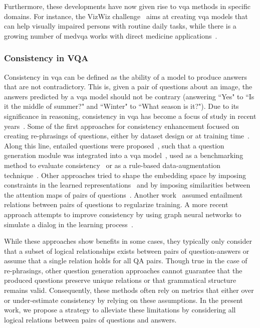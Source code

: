 Furthermore, these developments have now given rise to \gls{vqa} methods in specific domains. For instance, the VizWiz challenge~\cite{gurari2018vizwiz,gurari2019vizwiz,chen2022grounding} aims at creating \gls{vqa} models that can help visually impaired persons with routine daily tasks, while there is a growing number of \gls{medvqa} works with direct medicine applications~\cite{nguyen2019overcoming,gupta2021hierarchical,vu2020question,zhan2020medical}. 

\subsubsection{Consistency in VQA} Consistency in \gls{vqa} can be defined as the ability of a model to produce answers that are not contradictory. This is, given a pair of questions about an image, the answers predicted by a \gls{vqa} model should not be contrary (\eg answering ``Yes" to ``Is it the middle of summer?" and ``Winter" to ``What season is it?"). Due to its significance in reasoning, consistency in \gls{vqa} has become a focus of study in recent years~\cite{ribeiro2019red,shah2019cycle,gokhale2020vqa,selvaraju2020squinting,jing2022maintaining}. Some of the first approaches for consistency enhancement focused on creating re-phrasings of questions, either by dataset design or at training time~\cite{shah2019cycle}. Along this line, entailed questions were proposed~\cite{ribeiro2019red,gokhale2020vqa}, such that a question generation module was integrated into a \gls{vqa} model~\cite{ray2019sunny,goel2021iq}, used as a benchmarking method to evaluate consistency~\cite{yuan2021perception} or as a rule-based data-augmentation technique~\cite{ribeiro2019red}. Other approaches tried to shape the embedding space by imposing constraints in the learned representations~\cite{teney2019incorporating} and by imposing similarities between the attention maps of pairs of questions~\cite{selvaraju2020squinting}. Another work~\cite{tascon2022consistency} assumed entailment relations between pairs of questions to regularize training. A more recent approach attempts to improve consistency by using graph neural networks to simulate a dialog in the learning process~\cite{jing2022maintaining}. 

While these approaches show benefits in some cases, they typically only consider that a subset of logical relationships exists between pairs of question-answers or assume that a single relation holds for all QA pairs. Though true in the case of re-phrasings, other question generation approaches cannot guarantee that the produced questions preserve unique relations or that grammatical structure remains valid. Consequently, these methods often rely on metrics that either over or under-estimate consistency by relying on these assumptions. In the present work, we propose a strategy to alleviate these limitations by considering all logical relations between pairs of questions and answers. 

